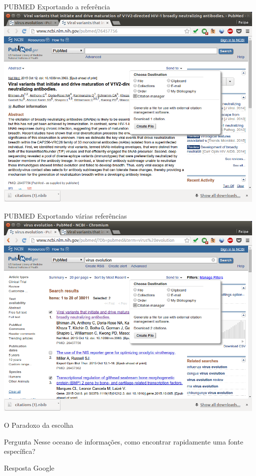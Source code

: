 \documentclass{beamer}
\begin{document}
\begin{frame}{PUBMED Exportando a referência}
  \includegraphics[height=.85\textheight]{Busca/pubmed-export1}
\end{frame}

\begin{frame}{PUBMED Exportando várias referências}
  \includegraphics[height=.85\textheight]{Busca/pubmed-export2}
\end{frame}

\begin{frame}{O Paradoxo da escolha}
  \begin{block}{Pergunta}
    Nesse oceano de informações, como encontrar rapidamente uma fonte
    específica?
  \end{block}
  \pause
  \begin{block}{Resposta}
    Google
  \end{block}
\end{frame}
\end{document}
